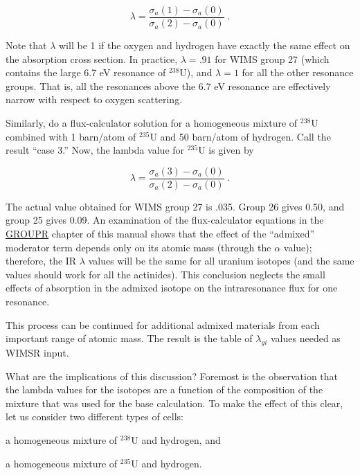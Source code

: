 \begin{equation}
\lambda = \frac{\sigma_a(1)-\sigma_a(0)}{\sigma_a(2)-\sigma_a(0)}\;.
\end{equation}
\vspace{0.5 pt}

\noindent
Note that $\lambda$ will be 1 if the oxygen and hydrogen have
exactly the same effect on the absorption cross section.  In practice,
$\lambda=.91$ for WIMS group 27 (which contains the large 6.7 eV
resonance of $^{238}$U), and $\lambda=1$ for all the other resonance
groups.  That is, all the resonances above the 6.7 eV resonance are
effectively narrow with respect to oxygen scattering.

Similarly, do a flux-calculator solution for a homogeneous mixture
of $^{238}$U combined with 1 barn/atom of $^{235}$U and 50 barn/atom
of hydrogen.  Call the result ``case 3.''  Now, the lambda value
for $^{235}$U is given by

\begin{equation}
\lambda = \frac{\sigma_a(3)-\sigma_a(0)}{\sigma_a(2)-\sigma_a(0)}\;.
\end{equation}
\vspace{0.5 pt}

\noindent
The actual value obtained for WIMS group 27 is .035.  Group 26 gives
0.50, and group 25 gives 0.09. An examination
of the flux-calculator equations in the
\hyperlink{sGROUPRhy}{GROUPR} chapter of this
manual shows that the effect of the ``admixed'' moderator term
depends only on its atomic mass (through the $\alpha$ value); therefore,
the IR $\lambda$ values will be the same for all uranium isotopes
(and the same values should work for all the actinides).  This
conclusion neglects the small effects of absorption in the admixed
isotope on the intraresonance flux for one resonance.

This process can be continued for additional admixed materials from
each important range of atomic mass.  The result is the table of
$\lambda_{gi}$ values needed as WIMSR input.

What are the implications of this discussion?  Foremost is the observation
that the lambda values for the isotopes are a function of the composition
of the mixture that was used for the base  calculation.  To make the
effect of this clear, let us consider two different types of cells:
\begin{enumerate}
\begin{singlespace}
\item a homogeneous mixture of $^{238}$U and hydrogen, and

\item a homogeneous mixture of $^{235}$U and hydrogen.
\end{singlespace}
\end{enumerate}
\vspace{0.5 pt}

